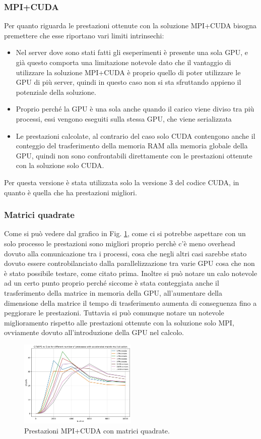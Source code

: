 \documentclass[conference]{IEEEtran}
\begin{document}
\subsubsection{MPI+CUDA}
Per quanto riguarda le prestazioni ottenute con la soluzione MPI+CUDA bisogna premettere che esse riportano vari limiti intrinsechi:
\begin{itemize}
    \item Nel server dove sono stati fatti gli eseperimenti è presente una sola GPU, e già questo comporta una limitazione notevole dato che il vantaggio di utilizzare la soluzione MPI+CUDA è proprio quello di poter utilizzare le GPU di più server, quindi in questo caso non si sta sfruttando appieno il potenziale della soluzione.
    \item Proprio perché la GPU è una sola anche quando il carico viene diviso tra più processi, essi vengono eseguiti sulla stessa GPU, che viene serializzata
    \item Le prestazioni calcolate, al contrario del caso solo CUDA contengono anche il conteggio del trasferimento della memoria RAM alla memoria globale della GPU, quindi non sono confrontabili direttamente con le prestazioni ottenute con la soluzione solo CUDA.
\end{itemize}
Per questa versione è stata utilizzata solo la versione 3 del codice CUDA, in quanto è quella che ha prestazioni migliori.
\subsubsection{Matrici quadrate}
Come si può vedere dal grafico in Fig. \ref{fig:mpi_cuda_square}, come ci si potrebbe aspettare con un solo processo le prestazioni sono migliori proprio perchè c'è meno overhead dovuto alla comunicazione tra i processi, cosa che negli altri casi sarebbe stato dovuto essere controbilanciato dalla parallelizzazione tra varie GPU cosa che non è stato possibile testare, come citato prima. 
Inoltre si può notare un calo notevole ad un certo punto proprio perché siccome è stata conteggiata anche il trasferimento della matrice in memoria della GPU, all'aumentare della dimensione della matrice il tempo di trasferimento aumenta di conseguenza fino a peggiorare le prestazioni. Tuttavia si può comunque notare un notevole miglioramento rispetto alle prestazioni ottenute con la soluzione solo MPI, ovviamente dovuto all'introduzione della GPU nel calcolo.
\begin{figure}[H]
    \centering
    \includegraphics[width=0.5\textwidth]{resources/mpi_cuda_square.jpg}
    \caption{Prestazioni MPI+CUDA con matrici quadrate.}
    \label{fig:mpi_cuda_square}
\end{figure}
\end{document}

